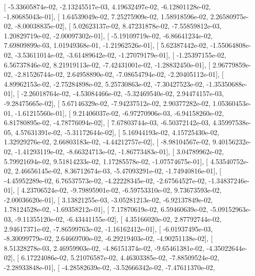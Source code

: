 \documentclass{article}
\begin{document}
       [ -5.33605874e-02,  -2.13245517e-03,   4.19632497e-02,
         -6.12801128e-02,  -1.80685043e-01],
       [  1.64539049e-02,   7.25275909e-02,   1.58918596e-02,
          2.26580975e-02,  -8.00038835e-02],
       [  5.02623137e-02,   8.47231878e-02,  -7.55859812e-03,
          1.20829719e-02,  -2.00097302e-01],
       [ -5.19109719e-02,  -6.86641234e-02,   7.69809899e-03,
          1.01949368e-01,  -1.21962526e-01],
       [  5.62387442e-02,  -1.55064808e-02,  -3.53611014e-02,
         -3.61489642e-02,  -1.27079179e-01],
       [ -1.25397155e-02,   6.56737846e-02,   8.21919113e-02,
         -7.42431001e-02,  -1.28832450e-01],
       [  2.96779859e-02,  -2.81526744e-02,   2.64958890e-02,
         -7.08654794e-02,  -2.20405112e-01],
       [  4.89962153e-02,  -2.75284898e-02,   5.25730863e-02,
         -7.30427523e-02,  -1.35350688e-01],
       [ -2.26018764e-02,  -4.53084466e-02,  -5.32469540e-02,
          2.94474157e-03,  -9.28475665e-02],
       [  5.67146329e-02,  -7.94237512e-02,   2.90377282e-02,
          1.05360453e-01,  -1.61215560e-01],
       [  9.21406037e-02,  -6.97270906e-03,  -6.94158260e-02,
          6.81780895e-02,  -4.78776094e-02],
       [  7.67803744e-03,  -6.50372142e-03,   4.35997538e-05,
          4.57631391e-02,  -5.31172644e-02],
       [  5.16944193e-02,   4.15725430e-02,   1.32929276e-02,
          2.66803183e-02,  -4.44212757e-02],
       [ -8.98104567e-02,   9.40156232e-02,  -1.41293119e-02,
         -8.66324713e-02,  -1.86773483e-01],
       [  3.04789962e-02,   5.79921694e-02,   9.51814233e-02,
          1.17285578e-02,  -1.07574675e-01],
       [  4.53540752e-02,   2.46656145e-02,   8.36712674e-03,
         -5.47093291e-02,  -1.74940816e-01],
       [ -4.45952289e-02,   6.76537573e-02,  -4.22228345e-02,
         -2.67564527e-02,  -1.34837246e-01],
       [  4.23706524e-02,  -9.79895901e-02,  -6.59753310e-02,
          9.73673593e-02,  -2.00036620e-01],
       [  3.13821255e-03,  -3.05281213e-02,  -6.92137849e-02,
          1.78124528e-02,  -1.69358212e-01],
       [  7.17870619e-02,   6.59460639e-02,  -5.09152963e-03,
         -9.11355120e-02,  -6.43441155e-02],
       [  4.35166020e-02,   2.87792744e-02,   2.94617371e-02,
         -7.86599763e-02,  -1.16162412e-01],
       [ -6.01937495e-03,  -8.30099779e-02,   2.64669700e-02,
         -6.29219403e-02,  -4.90251138e-02],
       [  8.51328278e-03,   2.46959903e-02,  -4.86151374e-02,
         -9.65461381e-02,  -4.35022644e-02],
       [  6.17224086e-02,   5.21076587e-02,   4.46303385e-02,
         -7.88509524e-02,  -2.28933848e-01],
       [ -4.28582639e-02,  -3.52666342e-02,  -7.47611370e-02,
\end{document}
